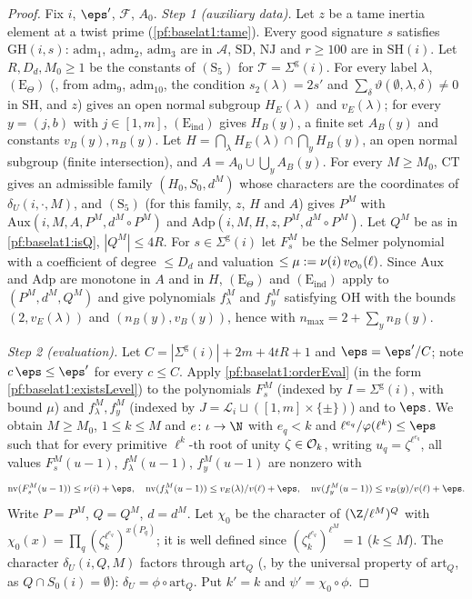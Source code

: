 \begin{proof}
Fix $i$, $\eps'$, $\mathcal F$, $A_0$. \emph{Step 1 (auxiliary data).} Let $z$ be a tame inertia element at a twist
prime (\cref{pf:baselat1:tame}). Every good signature $s$ satisfies $\mathrm{GH}(i,s)$: $\mathrm{adm}_1$,
$\mathrm{adm}_2$, $\mathrm{adm}_3$ are in $\mathcal{A}$, $\mathrm{SD}$, $\mathrm{NJ}$ and $r\ge100$ are in
$\mathrm{SH}(i)$. Let $R,D_d,M_0\ge1$ be the constants of
$(\mathrm{S}_5)$ for $\mathcal T=\Sigma^{\mathrm g}(i)$. For every label $\lambda$,
$(\mathrm{E}_{\Theta})$ (, from $\mathrm{adm}_9$, $\mathrm{adm}_{10}$, the condition
$s_2(\lambda)=2s'$ and $\sum_\delta\vartheta(\emptyset,\lambda,\delta)\ne0$ in $\mathrm{SH}$, and $z$) gives an open
normal subgroup $H_E(\lambda)$ and $v_E(\lambda)$; for every $y=(j,b)$ with $j\in[1,m]$, $(\mathrm{E}_{\mathrm{ind}})$ gives
$H_B(y)$, a finite set $A_B(y)$ and constants $v_B(y),n_B(y)$. Let $H=\bigcap_\lambda H_E(\lambda)\cap\bigcap_yH_B(y)$, an
open normal subgroup (finite intersection), and $A=A_0\cup\bigcup_yA_B(y)$. For every $M\ge M_0$, $\mathrm{CT}$ gives an
admissible family $(H_0,S_0,d^M)$ whose characters are the coordinates of $\delta_U(i,\cdot,M)$, and
$(\mathrm{S}_5)$ (for this family, $z$, $H$ and $A$) gives $P^M$ with
$\mathrm{Aux}(i,M,A,P^M,d^M\circ P^M)$ and $\mathrm{Adp}(i,M,H,z,P^M,d^M\circ P^M)$. Let $Q^M$ be as in
\cref{pf:baselat1:isQ}, $|Q^M|\le4R$. For $s\in\Sigma^{\mathrm g}(i)$ let $F^M_s$ be the Selmer polynomial with a coefficient of
degree $\le D_d$ and valuation $\le\mu:=\nu(i)\,v_{\mathcal O_0}(\ell)$. Since $\mathrm{Aux}$ and $\mathrm{Adp}$ are
monotone in $A$ and in $H$, $(\mathrm{E}_{\Theta})$ and $(\mathrm{E}_{\mathrm{ind}})$ apply to $(P^M,d^M,Q^M)$ and give polynomials
$f^M_\lambda$ and $f^M_y$ satisfying $\mathrm{OH}$ with the bounds $(2,v_E(\lambda))$ and $(n_B(y),v_B(y))$, hence
with $n_{\max}=2+\sum_yn_B(y)$.

\emph{Step 2 (evaluation).} Let $C=|\Sigma^{\mathrm g}(i)|+2m+4tR+1$ and $\eps=\eps'/C$; note $c\,\eps\le\eps'$ for every $c\le C$.
Apply \cref{pf:baselat1:orderEval} (in the form \cref{pf:baselat1:existsLevel}) to the polynomials $F^M_s$ (indexed by
$I=\Sigma^{\mathrm g}(i)$, with bound $\mu$) and $f^M_\lambda,f^M_y$ (indexed by $J=\mathcal L_i\sqcup([1,m]\times\{\pm\})$) and to
$\eps$. We obtain $M\ge M_0$, $1\le k\le M$ and $e\colon\iota\to\N$ with $e_q<k$ and $\ell^{e_q}/\varphi(\ell^k)\le\eps$ such
that for every primitive $\ell^k$-th root of unity $\zeta\in\mathcal O_k$, writing $u_q=\zeta^{\ell^{e_q}}$, all values
$F^M_s(u-1)$, $f^M_\lambda(u-1)$, $f^M_y(u-1)$ are nonzero with
\[
\baselatonenv(F^M_s(u-1))\le\nu(i)+\eps,\quad \baselatonenv(f^M_\lambda(u-1))\le v_E(\lambda)/v(\ell)+\eps,\quad
\baselatonenv(f^M_y(u-1))\le v_B(y)/v(\ell)+\eps.
\]
Write $P=P^M$, $Q=Q^M$, $d=d^M$. Let $\chi_0$ be the character of $(\Z/\ell^M)^Q$ with
$\chi_0(x)=\prod_q(\zeta_k^{\ell^{e_q}})^{x(P_q)}$; it is well defined since $(\zeta_k^{\ell^{e_q}})^{\ell^M}=1$ ($k\le M$).
The character $\delta_U(i,Q,M)$ factors through $\mathrm{art}_Q$ (, by the
universal property of $\mathrm{art}_Q$, as $Q\cap S_0(i)=\emptyset$): $\delta_U=\phi\circ\mathrm{art}_Q$. Put $k'=k$ and
$\psi'=\chi_0\circ\phi$.


\end{proof}
